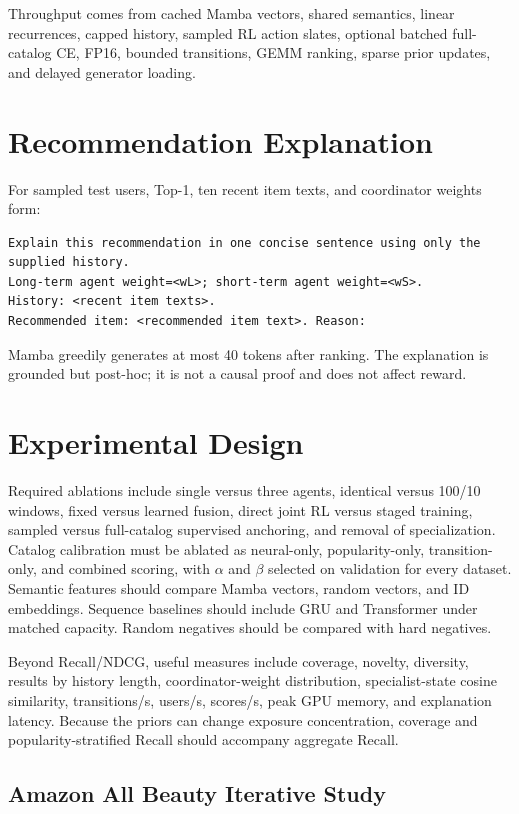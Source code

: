 \documentclass[11pt,a4paper]{article}
\begin{document}
Throughput comes from cached Mamba vectors, shared semantics, linear recurrences, capped history, sampled RL action slates, optional batched full-catalog CE, FP16, bounded transitions, GEMM ranking, sparse prior updates, and delayed generator loading.

\section{Recommendation Explanation}

For sampled test users, Top-1, ten recent item texts, and coordinator weights form:
\begin{lstlisting}[language={}]
Explain this recommendation in one concise sentence using only the supplied history.
Long-term agent weight=<wL>; short-term agent weight=<wS>.
History: <recent item texts>.
Recommended item: <recommended item text>. Reason:
\end{lstlisting}
Mamba greedily generates at most 40 tokens after ranking. The explanation is grounded but post-hoc; it is not a causal proof and does not affect reward.

\section{Experimental Design}

Required ablations include single versus three agents, identical versus 100/10
windows, fixed versus learned fusion, direct joint RL versus staged training,
sampled versus full-catalog supervised anchoring, and removal of specialization.
Catalog calibration must be ablated as neural-only, popularity-only,
transition-only, and combined scoring, with $\alpha$ and $\beta$ selected on
validation for every dataset. Semantic features should compare Mamba vectors,
random vectors, and ID embeddings. Sequence baselines should include GRU and
Transformer under matched capacity. Random negatives should be compared with
hard negatives.

Beyond Recall/NDCG, useful measures include coverage, novelty, diversity,
results by history length, coordinator-weight distribution, specialist-state
cosine similarity, transitions/s, users/s, scores/s, peak GPU memory, and
explanation latency. Because the priors can change exposure concentration,
coverage and popularity-stratified Recall should accompany aggregate Recall.

\subsection{Amazon All Beauty Iterative Study}
\end{document}
